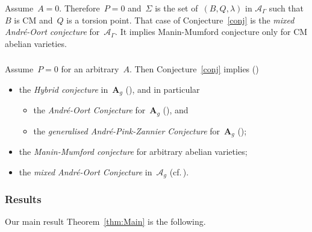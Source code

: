 \documentclass[12pt]{amsart}
\begin{document}
\subsubsection{}

Assume~$A=0$. Therefore~$P=0$ and~$\Sigma$ is the set of~$(B,Q,\lambda)$ in $\mathcal{A}_\Gamma$ such that~$B$ is CM and~$Q$ is a torsion point. That case of Conjecture~\ref{conj} is the \emph{mixed André-Oort conjecture} for~$\mathcal{A}_\Gamma$. It implies Manin-Mumford conjecture only for CM abelian varieties.
\subsubsection{}\label{sec:conj for P0}	
Assume~$P=0$ for an arbitrary~$A$. Then Conjecture~\ref{conj} implies (\cite{Pink})
\begin{itemize}
\item the \emph{Hybrid conjecture} in~$\mathbf{A}_g$ (\cite{RY:LMS2}), and in particular
\begin{itemize}
\item  the \emph{André-Oort Conjecture} for~$\mathbf{A}_g$ (\cite{PT,Tsimerman,AGHM,YZ}), and
\item  the \emph{generalised André-Pink-Zannier Conjecture} for~$\mathbf{A}_g$ (\cite{RY:IHES});
\end{itemize}
\item the \emph{Manin-Mumford conjecture} for arbitrary abelian varieties;
\item the \emph{mixed André-Oort Conjecture} in~$\mathcal{A}_g$ (cf.\,\cite{Gao}).
\end{itemize}

\subsubsection{Results}
Our main result Theorem~\ref{thm:Main} is the following.
\end{document}
